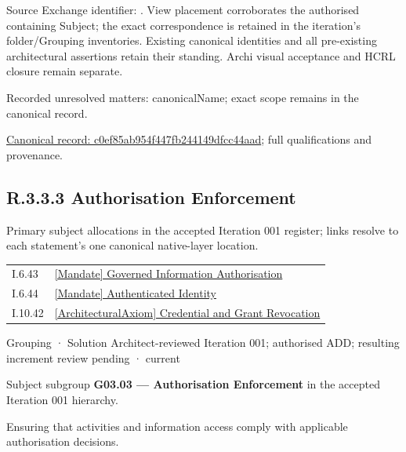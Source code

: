 Source Exchange identifier: \texttt{}. View placement corroborates
the authorised containing Subject; the exact correspondence is retained in the
iteration's folder/Grouping inventories. Existing canonical identities and all
pre-existing architectural assertions retain their standing. Archi visual
acceptance and HCRL closure remain separate.


{\small Recorded unresolved matters: canonicalName; exact scope remains in the canonical record.}\par
{\footnotesize \href{../../../../continuum/grouping/c0ef85ab954f447fb244149dfcc44aad.md}{Canonical record: c0ef85ab954f447fb244149dfcc44aad}; full qualifications and provenance.}\par
\subsection*{R.3.3.3 Authorisation Enforcement}
\label{navigation:R.3.3.3}

Primary subject allocations in the accepted Iteration 001 register; links resolve to each statement’s one canonical native-layer location.\par
\begin{longtable}{p{.22\linewidth}p{.73\linewidth}}
I.6.43 & \hyperref[element:8812fcd52d3f4afcbeef41b60bda5874]{[Mandate] Governed Information Authorisation} \\
I.6.44 & \hyperref[element:72b6d13c85944e2d93efc6c5f5a53d82]{[Mandate] Authenticated Identity} \\
I.10.42 & \hyperref[element:370d9a6e0e00402aba9720580a2e365e]{[ArchitecturalAxiom] Credential and Grant Revocation} \\
\end{longtable}
\label{element:fe8916b03b084e82af587ac5a900349b}
{\small Grouping · Solution Architect-reviewed Iteration 001; authorised ADD; resulting increment review pending · current}\par

Subject subgroup \textbf{G03.03 — Authorisation Enforcement} in the accepted Iteration 001 hierarchy.



Ensuring that activities and information access comply with applicable authorisation decisions.



